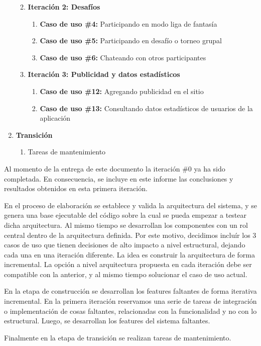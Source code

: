 \begin{enumerate}
\begin{enumerate}
\begin{enumerate}
    \end{enumerate}
    \item \large{\textbf{Iteración 2: Desafíos}}
    \begin{enumerate}
      \item \normalsize{\textbf{Caso de uso \#4:} Participando en modo liga de fantasía}
      \item \normalsize{\textbf{Caso de uso \#5:} Participando en desafío o torneo grupal}
      \item \normalsize{\textbf{Caso de uso \#6:} Chateando con otros participantes}
    \end{enumerate}
    \item \large{\textbf{Iteración 3: Publicidad y datos estadísticos}}
    \begin{enumerate}
      \item \normalsize{\textbf{Caso de uso \#12:} Agregando publicidad en el sitio}
      \item \normalsize{\textbf{Caso de uso \#13:} Consultando datos estadísticos de usuarios de la aplicación}
    \end{enumerate}
  \end{enumerate}
  \item \Large{\textbf{Transición}}
  \begin{enumerate}
    \item \normalsize{Tareas de mantenimiento}
  \end{enumerate}
\end{enumerate}

Al momento de la entrega de este documento la iteración \#0 ya ha sido completada. En consecuencia, se incluye en este informe las conclusiones y resultados obtenidos en esta
primera iteración.

En el proceso de elaboración se establece y valida la arquitectura del sistema, y se genera una base ejecutable del código sobre la cual se pueda empezar a testear dicha arquitectura.
Al mismo tiempo se desarrollan los componentes con un rol central dentro de la arquitectura definida. Por este motivo, decidimos incluír los 3 casos de uso que tienen decisiones 
de alto impacto a nivel estructural, dejando cada una en una iteración diferente. La idea es construir la arquitectura de forma incremental. La opción a nivel arquitectura propuesta
en cada iteración debe ser compatible con la anterior, y al mismo tiempo solucionar el caso de uso actual.

En la etapa de construcción se desarrollan los features faltantes de forma iterativa incremental. En la primera iteración reservamos una serie de tareas de integración o implementación
de cosas faltantes, relacionadas con la funcionalidad y no con lo estructural. Luego, se desarrollan los features del sistema faltantes.

Finalmente en la etapa de transición se realizan tareas de mantenimiento.
